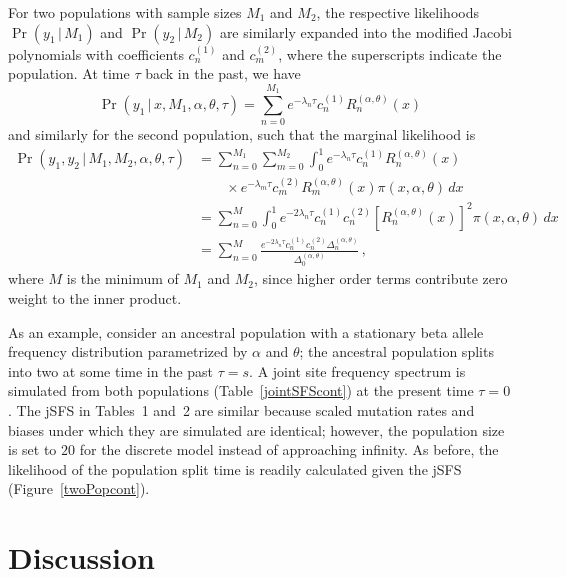\documentclass[preprint]{elsarticle}
\newcommand\given{{\,|\,}}
\begin{document}
For two populations with sample sizes $M_1$ and $M_2$, the respective likelihoods $\Pr(y_1\given M_1)$ and $\Pr(y_2\given M_2)$ are similarly expanded into the modified Jacobi polynomials with coefficients $c_n^{(1)}$ and $c_m^{(2)}$, where the superscripts indicate the population. At time $\tau$ back in the past, we have
\begin{equation}
    \Pr(y_1\given x, M_1,\alpha,\theta,\tau)=
    \sum_{n=0}^{M_1} e^{-\lambda_n\tau}c_n^{(1)}R_n^{(\alpha,\theta)}(x)
\end{equation}
and similarly for the second population, such that the marginal likelihood is
\begin{equation}
\begin{split}
    \Pr(y_1,y_2\given M_1,M_2,\alpha,\theta,\tau)&=
    \sum_{n=0}^{M_1}\sum_{m=0}^{M_2}\int_0^1 e^{-\lambda_n\tau}c_n^{(1)}R_n^{(\alpha,\theta)}(x)\\
    &\qquad\times e^{-\lambda_m\tau}c_m^{(2)} R_m^{(\alpha,\theta)}(x)\pi(x,\alpha,\theta)  \,dx\\&=
    \sum_{n=0}^{M}\int_0^1 e^{-2\lambda_n\tau}c_n^{(1)}c_n^{(2)} \left[R_n^{(\alpha,\theta)}(x)\right]^2\pi(x,\alpha,\theta)  \,dx\\
    &=\sum_{n=0}^{M}\frac{e^{-2\lambda_n\tau}c_n^{(1)} c_n^{(2)}\Delta_n^{(\alpha,\theta)}}{\Delta_0^{(\alpha,\theta)}}\,,
\end{split}
\end{equation}
where $M$ is the minimum of $M_1$ and $M_2$, since higher order terms contribute zero weight to the inner product. 

As an example, consider an ancestral population with a stationary beta allele frequency distribution parametrized by $\alpha$ and $\theta$; the ancestral population splits into two at some time in the past $\tau=s$. A joint site frequency spectrum is simulated from both populations (Table~\ref{jointSFScont}) at the present time $\tau=0$. The jSFS in Tables~1 and~2 are similar because scaled mutation rates and biases under which they are simulated are identical; however, the population size is set to $20$ for the discrete model instead of approaching infinity. As before, the likelihood of the population split time is readily calculated given the jSFS (Figure~\ref{twoPopcont}).

\section{Discussion}
\end{document}
